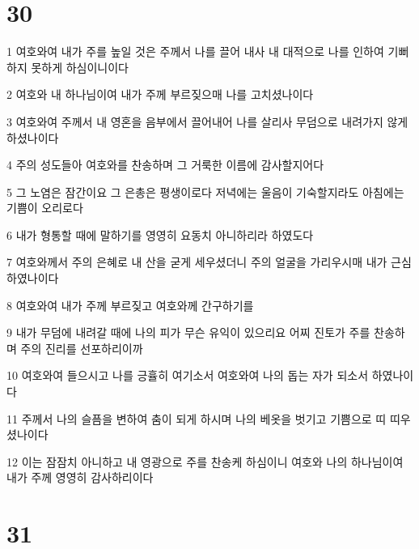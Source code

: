 \chapter{30}

\par 1 여호와여 내가 주를 높일 것은 주께서 나를 끌어 내사 내 대적으로 나를 인하여 기뻐하지 못하게 하심이니이다
\par 2 여호와 내 하나님이여 내가 주께 부르짖으매 나를 고치셨나이다
\par 3 여호와여 주께서 내 영혼을 음부에서 끌어내어 나를 살리사 무덤으로 내려가지 않게 하셨나이다
\par 4 주의 성도들아 여호와를 찬송하며 그 거룩한 이름에 감사할지어다
\par 5 그 노염은 잠간이요 그 은총은 평생이로다 저녁에는 울음이 기숙할지라도 아침에는 기쁨이 오리로다
\par 6 내가 형통할 때에 말하기를 영영히 요동치 아니하리라 하였도다
\par 7 여호와께서 주의 은혜로 내 산을 굳게 세우셨더니 주의 얼굴을 가리우시매 내가 근심하였나이다
\par 8 여호와여 내가 주께 부르짖고 여호와께 간구하기를
\par 9 내가 무덤에 내려갈 때에 나의 피가 무슨 유익이 있으리요 어찌 진토가 주를 찬송하며 주의 진리를 선포하리이까
\par 10 여호와여 들으시고 나를 긍휼히 여기소서 여호와여 나의 돕는 자가 되소서 하였나이다
\par 11 주께서 나의 슬픔을 변하여 춤이 되게 하시며 나의 베옷을 벗기고 기쁨으로 띠 띠우셨나이다
\par 12 이는 잠잠치 아니하고 내 영광으로 주를 찬송케 하심이니 여호와 나의 하나님이여 내가 주께 영영히 감사하리이다

\chapter{31}


